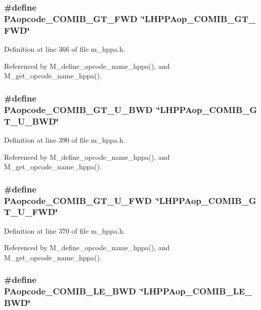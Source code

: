 \subsubsection{\setlength{\rightskip}{0pt plus 5cm}\#define PAopcode\_\-COMIB\_\-GT\_\-FWD~\char`\"{}LHPPAop\_\-COMIB\_\-GT\_\-FWD\char`\"{}}\label{m__hppa_8h_57252e05acf81191536dfb58199e345e}




Definition at line 366 of file m\_\-hppa.h.

Referenced by M\_\-define\_\-opcode\_\-name\_\-hppa(), and M\_\-get\_\-opcode\_\-name\_\-hppa().
\subsubsection{\setlength{\rightskip}{0pt plus 5cm}\#define PAopcode\_\-COMIB\_\-GT\_\-U\_\-BWD~\char`\"{}LHPPAop\_\-COMIB\_\-GT\_\-U\_\-BWD\char`\"{}}\label{m__hppa_8h_2d488c4b336d2b2bd4fcafeae21d6f03}




Definition at line 390 of file m\_\-hppa.h.

Referenced by M\_\-define\_\-opcode\_\-name\_\-hppa(), and M\_\-get\_\-opcode\_\-name\_\-hppa().
\subsubsection{\setlength{\rightskip}{0pt plus 5cm}\#define PAopcode\_\-COMIB\_\-GT\_\-U\_\-FWD~\char`\"{}LHPPAop\_\-COMIB\_\-GT\_\-U\_\-FWD\char`\"{}}\label{m__hppa_8h_0dc97ef63e227b788e9727b7eedb00b2}




Definition at line 370 of file m\_\-hppa.h.

Referenced by M\_\-define\_\-opcode\_\-name\_\-hppa(), and M\_\-get\_\-opcode\_\-name\_\-hppa().
\subsubsection{\setlength{\rightskip}{0pt plus 5cm}\#define PAopcode\_\-COMIB\_\-LE\_\-BWD~\char`\"{}LHPPAop\_\-COMIB\_\-LE\_\-BWD\char`\"{}}\label{m__hppa_8h_a29a61b086ba7fdc7424f83967edb479}




